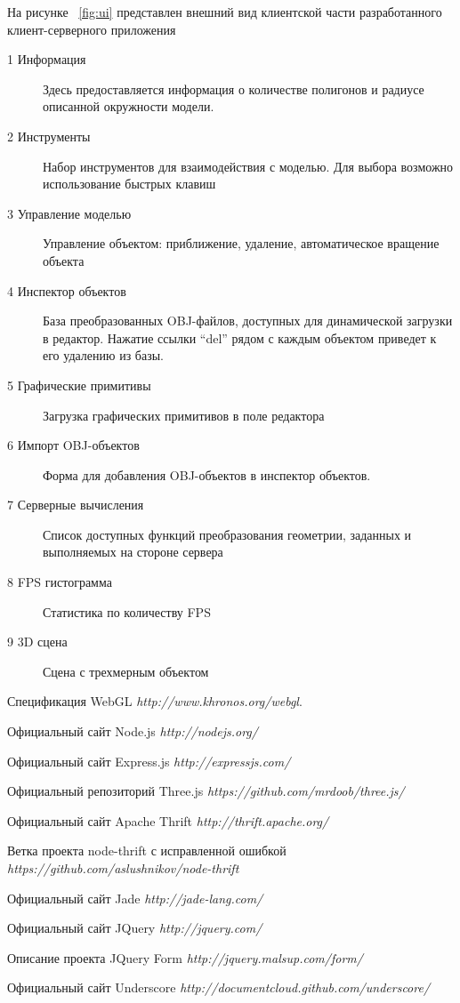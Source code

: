 \documentclass[14pt, a4paper]{extarticle}
\begin{document}
На рисунке ~\ref{fig:ui} представлен внешний вид клиентской части разработанного
клиент-серверного приложения
\begin{description}
    \item[1 Информация] Здесь предоставляется информация о количестве
    полигонов и радиусе описанной окружности модели.
    \item[2 Инструменты] Набор инструментов для
    взаимодействия с моделью. Для выбора возможно использование быстрых клавиш
    \item[3 Управление моделью] Управление объектом: приближение, удаление,
    автоматическое вращение объекта
    \item[4 Инспектор объектов] База преобразованных OBJ-файлов, доступных для
    динамической загрузки в редактор. Нажатие ссылки ``del'' рядом с каждым объектом
    приведет к его удалению из базы.
    \item[5 Графические примитивы] Загрузка графических примитивов в поле
    редактора
    \item[6 Импорт OBJ-объектов] Форма для добавления OBJ-объектов в инспектор
    объектов.
    \item[7 Серверные вычисления] Список доступных функций преобразования
    геометрии, заданных и выполняемых на стороне сервера
    \item[8 FPS гистограмма] Статистика по количеству FPS
    \item[9 3D сцена] Сцена с трехмерным объектом
\end{description}

\begin{thebibliography}{9}

  Спецификация WebGL
  \emph{http://www.khronos.org/webgl}.

  Официальный сайт Node.js
  \emph{http://nodejs.org/}

  Официальный сайт Express.js
  \emph{http://expressjs.com/}

  Официальный репозиторий Three.js
  \emph{https://github.com/mrdoob/three.js/}

  Официальный сайт Apache Thrift
  \emph{http://thrift.apache.org/}

  Ветка проекта node-thrift с исправленной ошибкой
  \emph{https://github.com/aslushnikov/node-thrift}

  Официальный сайт Jade
  \emph{http://jade-lang.com/}

  Официальный сайт JQuery
  \emph{http://jquery.com/}

  Описание проекта JQuery Form
  \emph{http://jquery.malsup.com/form/}

  Официальный сайт Underscore
  \emph{http://documentcloud.github.com/underscore/}

\end{thebibliography}
\end{document}
